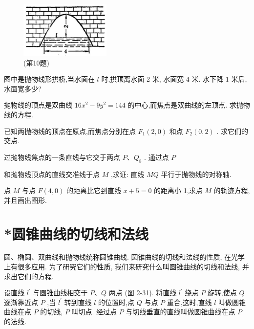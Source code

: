 \documentclass[lang=cn,newtx,10pt,scheme=chinese]{elegantbook}
\begin{document}
\begin{problemset}[习 题 八]
\begin{figure}[h]
  \centering
  \includegraphics[max width=0.4\textwidth]{images/01912cc2-ffb6-728e-9ae7-b113ff05c64b_116_944899.jpg}
  \caption{(第10题)}
\end{figure}



\item 图中是抛物线形拱桥,当水面在 \(l\) 时,拱顶离水面 2 米, 水面宽 4 米. 水下降 1 米后, 水面宽多少?

\item 抛物线的顶点是双曲线 \({16}{x}^{2} - 9{y}^{2} = {144}\) 的中心,而焦点是双曲线的左顶点. 求抛物线的方程.

\item 已知两抛物线的顶点在原点,而焦点分别在点 \({F}_{1}\left( {2,0}\right)\) 和点 \({F}_{2}\left( {0,2}\right)\) . 求它们的交点.

\item 过抛物线焦点的一条直线与它交于两点 \(P\text{、}{Q}_{8}\) . 通过点 \(P\)

和抛物线顶点的直线交准线于点 \(M\) ,求证: 直线 \({MQ}\) 平行于抛物线的对称轴.

\item 点 \(M\) 与点 \(F\left( {4,0}\right)\) 的距离比它到直线 \(x + 5 = 0\) 的距离小 1,求点 \(M\) 的轨迹方程,并且画出图形.

\end{problemset}

\section{*圆锥曲线的切线和法线}

圆、椭圆、双曲线和抛物线统称圆锥曲线. 圆锥曲线的切线和法线的性质, 在光学上有很多应用. 为了研究它们的性质, 我们来研究什么叫圆锥曲线的切线和法线, 并求出它们的方程.

设直线 \({l}^{\prime }\) 与圆锥曲线相交于 \(P\text{、}Q\) 两点 (图 2-31). 将直线 \({l}^{\prime }\) 绕点 \(P\) 旋转,使点 \(Q\) 逐渐靠近点 \(P\) ,当 \({l}^{\prime }\) 转到直线 \(l\) 的位置时,点 \(Q\) 与点 \(P\) 重合,这时,直线 \(l\) 叫做圆锥曲线在点 \(P\) 的切线, \(P\) 叫切点. 经过点 \(P\) 与切线垂直的直线叫做圆锥曲线在点 \(P\) 的法线.
\end{document}
